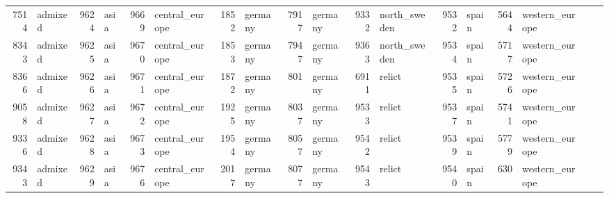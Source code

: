\begin{table}[h]
{\begin{tabular}{rl|rl|rl|rl|rl|rl|rl|rl|rl}
			7514                   & admixed         & 9624                   & asia            & 9669                   & central\_europe & 1852                   & germany         & 7917                   & germany                 & 9332                   & north\_sweden           & 9532                   & spain           & 5644                   & western\_europe &                          &                 \\
			8343                   & admixed         & 9625                   & asia            & 9670                   & central\_europe & 1853                   & germany         & 7947                   & germany                 & 9363                   & north\_sweden           & 9534                   & spain           & 5717                   & western\_europe &                          &                 \\
			8366                   & admixed         & 9626                   & asia            & 9671                   & central\_europe & 1872                   & germany         & 801                    & germany                 & 6911                   & relict                  & 9535                   & spain           & 5726                   & western\_europe &                          &                 \\
			9058                   & admixed         & 9627                   & asia            & 9672                   & central\_europe & 1925                   & germany         & 8037                   & germany                 & 9533                   & relict                  & 9537                   & spain           & 5741                   & western\_europe &                          &                 \\
			9336                   & admixed         & 9628                   & asia            & 9673                   & central\_europe & 1954                   & germany         & 8057                   & germany                 & 9542                   & relict                  & 9539                   & spain           & 5779                   & western\_europe &                          &                 \\
			9343                   & admixed         & 9629                   & asia            & 9676                   & central\_europe & 2017                   & germany         & 8077                   & germany                 & 9543                   & relict                  & 9540                   & spain           & 630                    & western\_europe &                          &                 \\

\end{tabular}}
\end{table}
